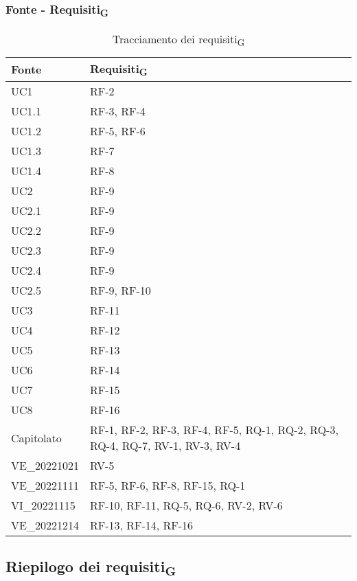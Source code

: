 \subsubsection{Fonte - Requisiti\textsubscript{G}}
\begin{table}[H]
	\centering
	\begin{tabular}{| p{} | p{} |} 
 \hline
 \textbf{Fonte} & \textbf{Requisiti\textsubscript{G}} \\
 \hline
	UC1 & RF-2\\
	\hline
	UC1.1 & RF-3, RF-4\\
	\hline
	UC1.2 & RF-5, RF-6\\
	\hline
	UC1.3 & RF-7\\
	\hline
	UC1.4 & RF-8\\
	\hline
	UC2 & RF-9\\
 	\hline
	UC2.1 & RF-9\\
 	\hline
	UC2.2 & RF-9\\
  	\hline
	UC2.3 & RF-9\\
  	\hline
	UC2.4 & RF-9\\
  	\hline
	UC2.5 & RF-9, RF-10\\
	\hline
	UC3 & RF-11\\ 
	\hline
	UC4 & RF-12\\
 	\hline
	UC5 & RF-13\\
 	\hline
	UC6 & RF-14\\
 	\hline
	UC7 & RF-15\\
 	\hline
	UC8 & RF-16\\
	\hline
	Capitolato & RF-1, RF-2, RF-3, RF-4, RF-5, RQ-1, RQ-2, RQ-3, RQ-4, RQ-7, RV-1, RV-3, RV-4\\
 	\hline
	VE\_20221021 & RV-5\\
	\hline
	VE\_20221111 & RF-5, RF-6, RF-8, RF-15, RQ-1\\
	\hline
	VI\_20221115 & RF-10, RF-11, RQ-5, RQ-6, RV-2, RV-6\\
 	\hline
	VE\_20221214 & RF-13, RF-14, RF-16\\
	\hline
	\end{tabular}
	\caption{Tracciamento dei requisiti\textsubscript{G}}
\end{table}

\subsection{Riepilogo dei requisiti\textsubscript{G}}

